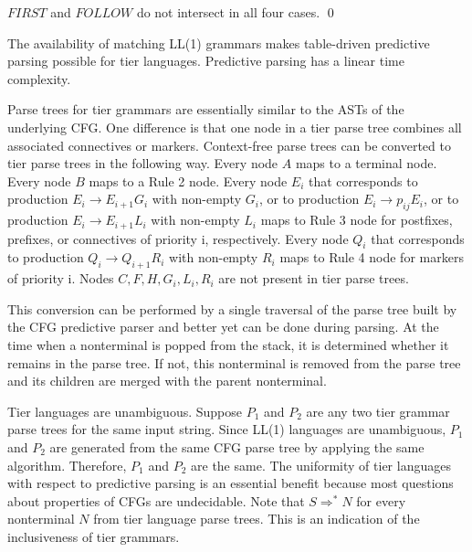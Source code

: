 \documentclass{llncs}
\begin{document}
$FIRST$ and $FOLLOW$ do not intersect in all four cases. \qed

The availability of matching LL(1) grammars makes table-driven predictive parsing \cite{Aho06} possible for tier languages. Predictive parsing has a linear time complexity. 

Parse trees for tier grammars are essentially similar to the ASTs of the underlying CFG. One difference is that one node in a tier parse tree combines all associated connectives or markers. Context-free parse trees can be converted to tier parse trees in the following way. Every node $A$ maps to a terminal node. Every node $B$ maps to a Rule 2 node. Every node $E_i$ that corresponds to production $E_i \rightarrow E_{i+1} G_i$ with non-empty $G_i$, or to production $E_i \rightarrow p_{ij} E_i$, or to production $E_i \rightarrow E_{i+1} L_i$ with non-empty $L_i$ maps to Rule 3 node for postfixes, prefixes, or connectives of priority i, respectively. Every node $Q_i$ that corresponds to production $Q_i \rightarrow Q_{i+1} R_i$ with non-empty $R_i$ maps to Rule 4 node for markers of priority i. Nodes $C, F, H, G_i ,L_i, R_i$ are not present in tier parse trees. 

This conversion can be performed by a single traversal of the parse tree built by the CFG predictive parser \cite{Aho06} and better yet can be done during parsing. At the time when a nonterminal is popped from the stack, it is determined whether it remains in the parse tree. If not, this nonterminal is removed from the parse tree and its children are merged with the parent nonterminal.  

Tier languages are unambiguous. Suppose $P_1$ and $P_2$ are any two tier grammar parse trees for the same input string. Since LL(1) languages are unambiguous, $P_1$ and $P_2$ are generated from the same CFG parse tree by applying the same algorithm. Therefore, $P_1$ and $P_2$ are the same. The uniformity of tier languages with respect to predictive parsing is an essential benefit because most questions about properties of CFGs are undecidable. Note that $S \Rightarrow^* N$ for every nonterminal $N$ from tier language parse trees. This is an indication of the inclusiveness of tier grammars.
\end{document}
